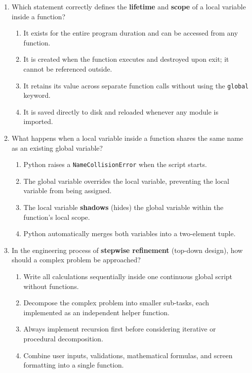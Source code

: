 \documentclass[11pt,a4paper]{article}
\begin{document}
\begin{enumerate}[label=\textbf{Q\arabic*.},leftmargin=2em,itemsep=1.5pt,topsep=1pt,resume]

\item Which statement correctly defines the \textbf{lifetime} and \textbf{scope} of a local variable inside a function?
\begin{enumerate}[label=\Alph*.,leftmargin=2em]
  \item It exists for the entire program duration and can be accessed from any function.
  \item It is created when the function executes and destroyed upon exit; it cannot be referenced outside.
  \item It retains its value across separate function calls without using the \texttt{global} keyword.
  \item It is saved directly to disk and reloaded whenever any module is imported.
\end{enumerate}

\item What happens when a local variable inside a function shares the same name as an existing global variable?
\begin{enumerate}[label=\Alph*.,leftmargin=2em]
  \item Python raises a \texttt{NameCollisionError} when the script starts.
  \item The global variable overrides the local variable, preventing the local variable from being assigned.
  \item The local variable \textbf{shadows} (hides) the global variable within the function's local scope.
  \item Python automatically merges both variables into a two-element tuple.
\end{enumerate}

\item In the engineering process of \textbf{stepwise refinement} (top-down design), how should a complex problem be approached?
\begin{enumerate}[label=\Alph*.,leftmargin=2em]
  \item Write all calculations sequentially inside one continuous global script without functions.
  \item Decompose the complex problem into smaller sub-tasks, each implemented as an independent helper function.
  \item Always implement recursion first before considering iterative or procedural decomposition.
  \item Combine user inputs, validations, mathematical formulas, and screen formatting into a single function.
\end{enumerate}


\end{enumerate}
\end{document}

